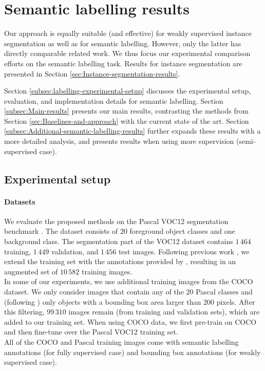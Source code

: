 \documentclass[10pt,english,british,twocolumn]{article}
\begin{document}
\section{\label{sec:Semantic-labelling-results}Semantic labelling results}

Our approach is equally suitable (and effective) for weakly supervised
instance segmentation as well as for semantic labelling. However,
only the latter has directly comparable related work. We thus focus
our experimental comparison efforts on the semantic labelling task.
Results for instance segmentation are presented in Section \ref{sec:Instance-segmentation-results}.

Section \ref{subsec:labelling-experimental-setup} discusses the experimental
setup, evaluation, and implementation details for semantic labelling.
Section \ref{subsec:Main-results} presents our main results, contrasting
the methods from Section \ref{sec:Baselines-and-approach} with the
current state of the art. Section \ref{subsec:Additional-semantic-labelling-results}
further expands these results with a more detailed analysis, and presents
results when using more supervision (semi-supervised case).

\subsection{\label{subsec:labelling-experimental-setup}Experimental setup}

\paragraph{Datasets}

We evaluate the proposed methods on the Pascal VOC12 segmentation
benchmark \cite{Everingham15}. The dataset consists of $20$ foreground
object classes and one background class. The segmentation part of
the VOC12 dataset contains $1\,464$ training, $1\,449$ validation,
and $1\,456$ test images. Following previous work \cite{Chen2015Iclr,Dai2015Iccv},
we extend the training set with the annotations provided by \cite{Hariharan2011Iccv},
resulting in an augmented set of $10\,582$ training images.\\
In some of our experiments, we use additional training images from
the COCO \cite{Lin2014EccvCoco} dataset. We only consider images
that contain any of the $20$ Pascal classes and (following \cite{Zheng2015IccvCrfAsRnn})
only objects with a bounding box area larger than $200$ pixels. After
this filtering, $99\,310$ images remain (from training and validation
sets), which are added to our training set. When using COCO data,
we first pre-train on COCO and then fine-tune over the Pascal VOC12
training set.\\
All of the COCO and Pascal training images come with semantic labelling
annotations (for fully supervised case) and bounding box annotations
(for weakly supervised case).
\end{document}
